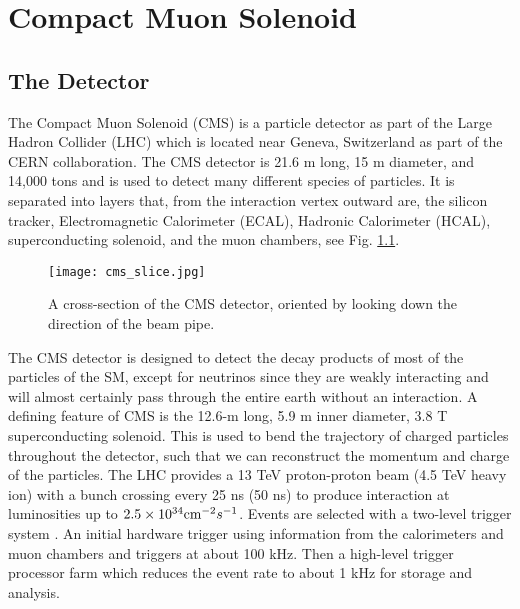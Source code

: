 \chapter{Compact Muon Solenoid}
\label{ch:CMS}

\section{The Detector}
\label{sec:cmsIntro}

The Compact Muon Solenoid (CMS) \cite{collaboration_cms_2008} is a particle detector as part of the Large Hadron Collider (LHC) \cite{evans_lhc_2008} which is located near Geneva, Switzerland as part of the CERN collaboration. The CMS detector is 21.6 m long, 15 m diameter, and 14,000 tons and is used to detect many different species of particles. It is separated into layers that, from the interaction vertex outward are, the silicon tracker, Electromagnetic Calorimeter (ECAL), Hadronic Calorimeter (HCAL), superconducting solenoid, and the muon chambers, see Fig. \ref{CMSSlice}. 

\begin{figure}
 	\centering
	\texttt{[image: cms\_slice.jpg]}
 	\caption[CMS Cross Section]{A cross-section of the CMS detector, oriented by looking down the direction of the beam pipe. }
 	\label{CMSSlice} 
\end{figure}

The CMS detector is designed to detect the decay products of most of the particles of the SM, except for neutrinos since they are weakly interacting and will almost certainly pass through the entire earth without an interaction. A defining feature of CMS is the 12.6-m long, 5.9 m inner diameter, 3.8 T superconducting solenoid. This is used to bend the trajectory of charged particles throughout the detector, such that we can reconstruct the momentum and charge of the particles. The LHC provides a 13 TeV proton-proton beam (4.5 TeV heavy ion) with a bunch crossing every 25 ns (50 ns) to produce interaction at luminosities up to $2.5\times10^{34} \text{cm}^{-2}s^{-1}$. Events are selected with a two-level trigger system \cite{cms_collaboration_cms_2017}. An initial hardware trigger using information from the calorimeters and muon chambers and triggers at about 100 kHz. Then a high-level trigger processor farm which reduces the event rate to about 1 kHz for storage and analysis.

